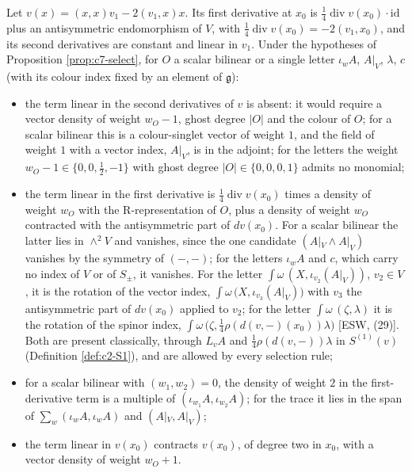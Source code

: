 \begin{corollary}
\label{cor:c7-K}
Let $v(x)=(x,x)v_1-2(v_1,x)x$. Its first derivative at $x_0$ is $\tfrac14\operatorname{div}v(x_0)\cdot\mathrm{id}$ plus an antisymmetric endomorphism of $V$, with $\tfrac14\operatorname{div}v(x_0)=-2(v_1,x_0)$, and its second derivatives are constant and linear in $v_1$. Under the hypotheses of Proposition \ref{prop:c7-select}, for $O$ a scalar bilinear or a single letter $\iota_wA$, $A|_V$, $\lambda$, $c$ (with its colour index fixed by an element of $\mathfrak g$):
\begin{itemize}
\item the term linear in the second derivatives of $v$ is absent: it would require a vector density of weight $w_O-1$, ghost degree $|O|$ and the colour of $O$; for a scalar bilinear this is a colour-singlet vector of weight $1$, and the field of weight $1$ with a vector index, $A|_V$, is in the adjoint; for the letters the weight $w_O-1\in\{0,0,\tfrac12,-1\}$ with ghost degree $|O|\in\{0,0,0,1\}$ admits no monomial;
\item the term linear in the first derivative is $\tfrac14\operatorname{div}v(x_0)$ times a density of weight $w_O$ with the R-representation of $O$, plus a density of weight $w_O$ contracted with the antisymmetric part of $dv(x_0)$. For a scalar bilinear the latter lies in $\wedge^2V$ and vanishes, since the one candidate $(A|_V\wedge A|_V)$ vanishes by the symmetry of $(-,-)$; for the letters $\iota_wA$ and $c$, which carry no index of $V$ or of $S_\pm$, it vanishes. For the letter $\int\omega\,(X,\iota_{v_2}(A|_V))$, $v_2\in V$, it is the rotation of the vector index, $\int\omega\,\big(X,\iota_{v_3}(A|_V)\big)$ with $v_3$ the antisymmetric part of $dv(x_0)$ applied to $v_2$; for the letter $\int\omega\,(\zeta,\lambda)$ it is the rotation of the spinor index, $\int\omega\,\big(\zeta,\tfrac14\rho(d(v,-)(x_0))\lambda\big)$ [ESW, (29)]. Both are present classically, through $L_vA$ and $\tfrac14\rho(d(v,-))\lambda$ in $S^{(1)}(v)$ (Definition \ref{def:c2-S1}), and are allowed by every selection rule;
\item for a scalar bilinear with $(w_1,w_2)=0$, the density of weight $2$ in the first-derivative term is a multiple of $(\iota_{w_1}A,\iota_{w_2}A)$; for the trace it lies in the span of $\sum_w(\iota_wA,\iota_wA)$ and $(A|_V,A|_V)$;
\item the term linear in $v(x_0)$ contracts $v(x_0)$, of degree two in $x_0$, with a vector density of weight $w_O+1$.
\end{itemize}
\end{corollary}

